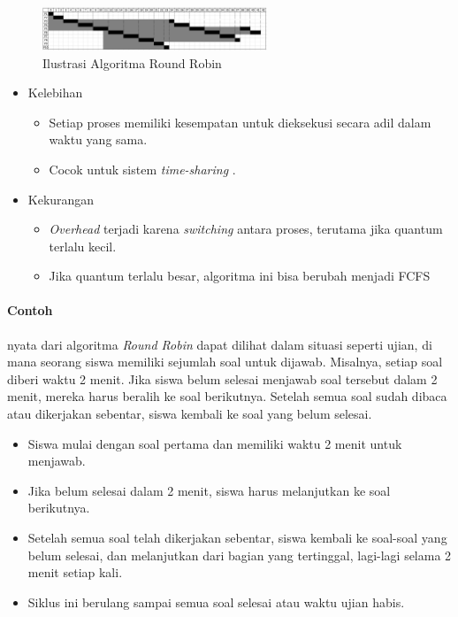 \documentclass[12pt]{article}
\begin{document}
\begin{figure}[h]
\centering
\includegraphics[width=0.6\textwidth]{asset/Kelompok5_Round Robbin.png}
\caption{Ilustrasi Algoritma Round Robin}
\label{fig:roundrobin}
\end{figure}

\begin{itemize}
\item Kelebihan
\begin{itemize}
    \item Setiap proses memiliki kesempatan untuk dieksekusi secara adil dalam waktu yang sama.
    \item Cocok untuk sistem \textit{time-sharing} .
\end{itemize}
\end{itemize}

\begin{itemize}
\item Kekurangan
\begin{itemize}
    \item \textit{Overhead} terjadi karena \textit{switching} antara proses, terutama jika quantum terlalu kecil.
    \item Jika quantum terlalu besar, algoritma ini bisa berubah menjadi FCFS
\end{itemize}
\end{itemize}

\paragraph{Contoh}
 nyata dari algoritma \textit{Round Robin} dapat dilihat dalam situasi seperti ujian, di mana seorang siswa memiliki sejumlah soal untuk dijawab. Misalnya, setiap soal diberi waktu 2 menit. Jika siswa belum selesai menjawab soal tersebut dalam 2 menit, mereka harus beralih ke soal berikutnya. Setelah semua soal sudah dibaca atau dikerjakan sebentar, siswa kembali ke soal yang belum selesai.
\begin{itemize}
    \item Siswa mulai dengan soal pertama dan memiliki waktu 2 menit untuk menjawab.
    \item Jika belum selesai dalam 2 menit, siswa harus melanjutkan ke soal berikutnya.
    \item Setelah semua soal telah dikerjakan sebentar, siswa kembali ke soal-soal yang belum selesai, dan melanjutkan dari bagian yang tertinggal, lagi-lagi selama 2 menit setiap kali.
    \item Siklus ini berulang sampai semua soal selesai atau waktu ujian habis.
\end{itemize}
\end{document}
